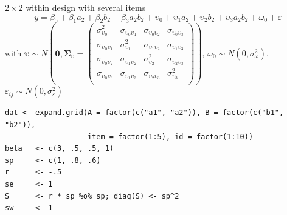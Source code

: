 \documentclass[aspectratio=169]{beamer}
\newcommand{\gvect}[1]{\boldsymbol{#1}}
\newcommand{\gmat}[1]{\boldsymbol{#1}}
\begin{document}
\begin{frame}[fragile]{$2\times 2$ within design with several items}
  \small
  \[
    y = \beta_0 + \beta_1 a_2 + \beta_2 b_2 + \beta_3 a_2b_2 +
        \upsilon_0 + \upsilon_1 a_2 + \upsilon_2 b_2 + \upsilon_3 a_2b_2 +
        \omega_0 + \varepsilon
  \]
  with $\gvect{\upsilon} \sim N\left(\gvect{0}, \gmat{\Sigma}_{\upsilon} = 
    \begin{pmatrix}
      \sigma^2_{\upsilon_0} & \sigma_{\upsilon_0\upsilon_1}  & \sigma_{\upsilon_0\upsilon_2} & \sigma_{\upsilon_0\upsilon_3}\\
      \sigma_{\upsilon_0\upsilon_1} & \sigma^2_{\upsilon_1}  & \sigma_{\upsilon_1\upsilon_2} & \sigma_{\upsilon_1\upsilon_3}\\
      \sigma_{\upsilon_0\upsilon_2} & \sigma_{\upsilon_1\upsilon_2} & \sigma^2_{\upsilon_2}  & \sigma_{\upsilon_2\upsilon_3}\\
      \sigma_{\upsilon_0\upsilon_3} & \sigma_{\upsilon_1\upsilon_3} & \sigma_{\upsilon_2\upsilon_3}  & \sigma^2_{\upsilon_3}\\
    \end{pmatrix}\right)$,
    $\omega_{0} \sim N(0, \sigma_{\omega}^2)$,
    $\varepsilon_{ij} \sim N(0, \sigma_{\varepsilon}^2)$
    \vspace{.5cm}
    \begin{lstlisting}
dat <- expand.grid(A = factor(c("a1", "a2")), B = factor(c("b1", "b2")),
                   item = factor(1:5), id = factor(1:10))
beta   <- c(3, .5, .5, 1)
sp     <- c(1, .8, .6)
r      <- -.5
se     <- 1
S      <- r * sp %o% sp; diag(S) <- sp^2
sw     <- 1
    \end{lstlisting}
\end{frame}
\end{document}
